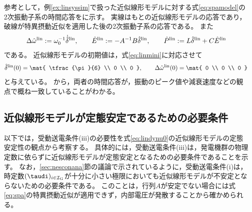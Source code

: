 \documentclass[tombow,dvipdfmx]{corona-a5-1.1}
\begin{document}


\begin{例}[近似線形モデルに対する特異摂動近似]
参考として，例\ref{ex:linsyssim}で扱った近似線形モデルに対する式\ref{eq:spamodel}の2次振動子系の時間応答をに示す。
実線はもとの近似線形モデルの応答であり，破線が特異摂動近似を適用した後の2次振動子系の応答である。
また
\[
\Delta \hat{\omega}^{\rm lin}:=\omega_0^{-1} \dot{\hat{\delta}}^{\rm lin},\qquad
\hat{E}^{\rm lin}:=-A^{-1}B\hat{\delta}^{\rm lin},\qquad
\hat{P}^{\rm lin}:= L \hat{\delta}^{\rm lin} + C \hat{E}^{\rm lin}
\]
である。
近似線形モデルの初期値は，式\ref{eq:linmini}に対応させて
\[
\hat{\delta}^{\rm lin}(0)
 =
\mat{
\tfrac{\pi}{6} \\
0 \\
0
},\qquad
\Delta \hat{\omega}^{\rm lin}(0)
 =
\mat{
0 \\
0 \\
0
}
\]
と与えている。
から，両者の時間応答が，振動のピーク値や減衰速度などの観点で概ね一致していることがわかる。
\end{例}

\subsection{近似線形モデルが定態安定であるための必要条件\advanced}\label{sec:nesconsta}

以下では，受動送電条件(iii)の必要性を式\ref{eq:lindynu0}の近似線形モデルの定態安定性の観点から考察する。
具体的には，受動送電条件(iii)は，発電機群の物理定数に依らずに近似線形モデルが定態安定となるための必要条件であることを示す。
なお，\ref{sec:nesconana}節の議論で示されているように，受動送電条件(i)は，時定数$(\taudi)_{i \in \mathcal{I}_{\rm G}}$が十分に小さい極限においても近似線形モデルが不安定とならないための必要条件である。
このことは，行列$A$が安定でない場合には式\ref{eq:spa}の特異摂動近似が適用できず，内部電圧が発散することから確かめられる。
\end{document}
